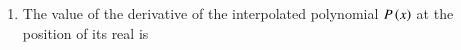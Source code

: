 \documentclass[journal]{IEEEtran}
\begin{document}
\begin{enumerate}
\begin{enumerate}
\begin{multicols}{2}
    \end{multicols}
\end{enumerate}
\item The value of the derivative of the interpolated polynomial $P\left(x\right)$ at the position of its real is
\begin{enumerate}
\end{enumerate}
\end{enumerate}
\end{document}
